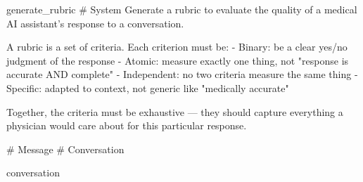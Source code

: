 \label{prompt:generate_rubric}
\begin{textbox}{generate\_rubric}
# System
Generate a rubric to evaluate the quality of a medical AI assistant's response to a conversation.

A rubric is a set of criteria. Each criterion must be:
- Binary: be a clear yes/no judgment of the response
- Atomic: measure exactly one thing, not "response is accurate AND complete"
- Independent: no two criteria measure the same thing
- Specific: adapted to context, not generic like "medically accurate"

Together, the criteria must be exhaustive — they should capture everything a physician would care about for this particular response.

# Message
# Conversation

{conversation}
\end{textbox}
